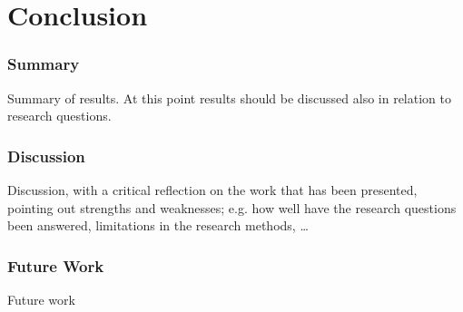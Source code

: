 \chapter{Conclusion}
\subsection{Summary}
Summary of results. At this point results should be discussed also in
relation to research questions.
\subsection{Discussion}
Discussion, with a critical reflection on the work that has been presented,
pointing out strengths and weaknesses; e.g. how well have the research questions been answered, limitations in the research methods, …
\subsection{Future Work}
Future work